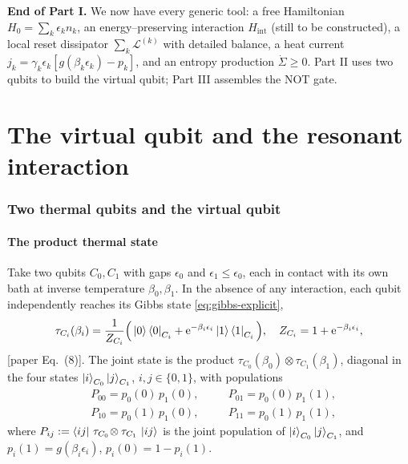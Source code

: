 \documentclass[11pt,a4paper]{article}
\newcommand{\ee}{\mathrm{e}}
\newcommand{\calL}{\mathcal{L}}
\theoremstyle{definition}
\theoremstyle{remark}
\begin{document}
\begin{keybox}
\textbf{End of Part I.} We now have every generic tool: a free
Hamiltonian $H_0=\sum_k\epsilon_k n_k$, an energy--preserving interaction
$H_{\mathrm{int}}$ (still to be constructed), a local reset dissipator
$\sum_k\calL^{(k)}$ with detailed balance, a heat current
$j_k=\gamma_k\epsilon_k[g(\beta_k\epsilon_k)-p_k]$, and an entropy
production $\dot\Sigma\ge0$. Part II uses two qubits to build the virtual
qubit; Part III assembles the NOT gate.
\end{keybox}

\part{The virtual qubit and the resonant interaction}
\label{part:virtual}

\section{Two thermal qubits and the virtual qubit}
\label{sec:virtual}

\subsection{The product thermal state}
Take two qubits $C_0,C_1$ with gaps $\epsilon_0$ and
$\epsilon_1\le\epsilon_0$, each in contact with its own bath at inverse
temperature $\beta_0,\beta_1$. In the absence of any interaction, each
qubit independently reaches its Gibbs state \eqref{eq:gibbs-explicit},
\begin{equation}
\tau_{C_i}(\beta_i)
= \frac{1}{Z_{C_i}}\Big(\ket{0}\bra{0}_{C_i}
+ \ee^{-\beta_i\epsilon_i}\ket{1}\bra{1}_{C_i}\Big),\quad
Z_{C_i}=1+\ee^{-\beta_i\epsilon_i},
\label{eq:tauCi}
\end{equation}
[paper Eq.~(8)]. The joint state is the product
$\tau_{C_0}(\beta_0)\otimes\tau_{C_1}(\beta_1)$, diagonal in the four
states $\ket{i}_{C_0}\ket{j}_{C_1}$, $i,j\in\{0,1\}$, with populations
\begin{equation}
\begin{aligned}
&P_{00}=p_0(0)\,p_1(0), &\quad& P_{01}=p_0(0)\,p_1(1),\\
&P_{10}=p_0(1)\,p_1(0), &\quad& P_{11}=p_0(1)\,p_1(1),
\end{aligned}
\label{eq:Pij}
\end{equation}
where $P_{ij}:=\bra{ij}\,\tau_{C_0}\!\otimes\tau_{C_1}\,\ket{ij}$ is the
joint population of $\ket{i}_{C_0}\ket{j}_{C_1}$, and
$p_i(1)=g(\beta_i\epsilon_i)$, $p_i(0)=1-p_i(1)$.
\end{document}
